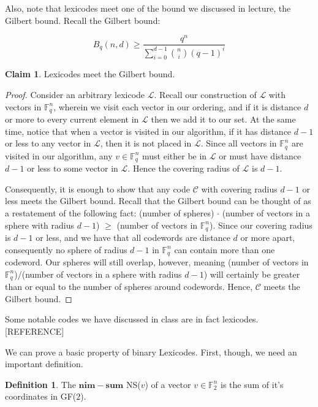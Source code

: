 \documentclass{article}
\numberwithin{theorem}{subsection}
\numberwithin{lemma}{subsection}
\theoremstyle{definition}
\numberwithin{exmp}{subsection}
\theoremstyle{definition}
\newtheorem{defn}{Definition}
\numberwithin{defn}{subsection}
\theoremstyle{definition}
\newtheorem{claim}{Claim}
\numberwithin{claim}{subsection}
\begin{document}
Also, note that lexicodes meet one of the bound we discussed in lecture, the Gilbert bound.  Recall the Gilbert bound:

\begin{equation}
B_q(n,d) \ge \frac{q^n}{\sum_{i=0}^{d-1} \binom{n}{i}(q-1)^{i}}
\end{equation}

\begin{claim}
Lexicodes meet the Gilbert bound.
\end{claim}

\begin{proof}
Consider an arbitrary lexicode $\mathcal{L}$.  Recall our construction of $\mathcal{L}$ with vectors in $\mathbb{F}_q^n$, wherein we visit each vector in our ordering,
and if it is distance $d$ or more to every current element in $\mathcal{L}$ then we add it to our set.  At the same time, notice that when a vector is visited in our algorithm, 
if it has distance $d-1$ or less to any vector in $\mathcal{L}$, then it is not placed in $\mathcal{L}$.  Since all vectors in $\mathbb{F}_q^n$ are visited in our algorithm, any
$v \in \mathbb{F}_q^n$ must either be in $\mathcal{L}$ or must have distance $d-1$ or less to some vector in $\mathcal{L}$.  Hence the covering radius of $\mathcal{L}$ is $d-1$.  

Consequently, it is enough to show that any code $\mathcal{C}$ with covering radius $d-1$ or less meets the Gilbert bound.  Recall that the Gilbert bound can be thought of as a restatement of the 
following fact: (number of spheres) $\cdot$ (number of vectors in a sphere with radius $d-1$) $\ge$ (number of vectors in $\mathbb{F}_q^n$).  Since our covering radius
is $d-1$ or less, and we have that all codewords are distance $d$ or more apart, consequently no sphere of radius $d-1$ in $\mathbb{F}_q^n$ can contain more than one codeword.
Our spheres will still overlap, however, meaning (number of vectors in
$\mathbb{F}_q^n$)/(number of vectors in a sphere with radius $d-1$) will
certainly be greater than or equal to the number of spheres around codewords.
Hence, $\mathcal{C}$ meets the Gilbert bound.
\end{proof} 

Some notable codes we have discussed in class are in fact lexicodes.
[REFERENCE]

We can prove a basic property of binary Lexicodes.  First, though, we
need an important definition.  

\begin{defn}
The $\mathbf{nim-sum}$ NS($v$) of a vector $v \in \mathbb{F}_2^n$ is the sum of
it's coordinates in GF($2$).
\end{defn}
\end{document}
